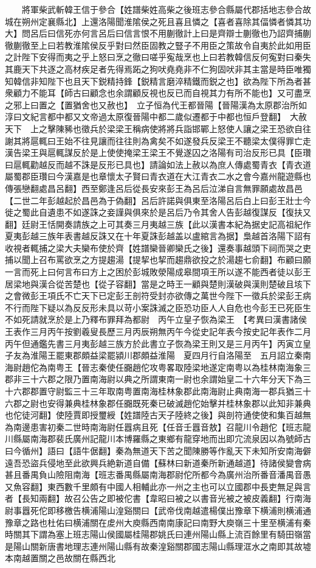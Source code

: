 　　將軍柴武斬韓王信于參合【姓譜柴姓高柴之後班志參合縣屬代郡括地志參合故城在朔州定襄縣北】上還洛陽聞淮隂侯之死且喜且憐之【喜者喜除其偪憐者憐其功大】問呂后曰信死亦何言呂后曰信言恨不用蒯徹計上曰是齊辯士蒯徹也乃詔齊捕蒯徹蒯徹至上曰若教淮隂侯反乎對曰然臣固教之豎子不用臣之策故令自夷於此如用臣之計陛下安得而夷之乎上怒曰烹之徹曰嗟乎寃哉烹也上曰若教韓信反何寃對曰秦失其鹿天下共逐之高材疾足者先得焉跖之狗吠堯堯非不仁狗固吠非其主當是時臣唯獨知韓信非知陛下也且天下鋭精持鋒【鋭精言磨淬精鐵而鋭之也】欲為陛下所為者甚衆顧力不能耳【師古曰顧念也余謂顧反視也反已而自視其力有所不能也】又可盡烹之邪上曰置之【置猶舍也又赦也】　立子恒為代王都晉陽【晉陽漢為太原郡治所如淳曰文紀言都中都又文帝過太原復晉陽中都二歲似遷都于中都也恒戶登翻】　大赦天下　上之擊陳豨也徵兵於梁梁王稱病使將將兵詣邯鄲上怒使人讓之梁王恐欲自往謝其將扈輒曰王始不往見讓而往往則為禽矣不如遂發兵反梁王不聽梁太僕得罪亡走漢告梁王與扈輒謀反於是上使使掩梁王梁王不覺遂囚之洛陽有司治反形已具【臣瓚曰扈輒勸越反而越不誅是反形已具也】請論如法上赦以為庶人傳處蜀青衣【青衣道屬蜀郡臣瓚曰今漢嘉是也章懷太子賢曰青衣道在大江青衣二水之會今嘉州龍遊縣也傳張戀翻處昌呂翻】西至鄭逢呂后從長安來彭王為呂后泣涕自言無罪願處故昌邑【二世二年彭越起於昌邑為于偽翻】呂后許諾與俱東至洛陽呂后白上曰彭王壯士今徙之蜀此自遺患不如遂誅之妾謹與俱來於是呂后乃令其舍人告彭越復謀反【復扶又翻】廷尉王恬開奏請族之上可其奏三月夷越三族【此以漢書本紀為据史記高祖紀作夏夷彭越三族年表書越反誅又在十年夏誅彭越盖以盧綰言為据】梟越首洛陽下詔有收視者輒捕之梁大夫欒布使於齊【姓譜欒晉卿欒氏之後】還奏事越頭下祠而哭之吏捕以聞上召布罵欲烹之方提趨湯【提挈也挈而趨鼎欲投之於湯趨七俞翻】布顧曰願一言而死上曰何言布曰方上之困於彭城敗滎陽成皋間項王所以遂不能西者徒以彭王居梁地與漢合從苦楚也【從子容翻】當是之時王一顧與楚則漢破與漢則楚破且垓下之會微彭王項氏不亡天下已定彭王剖符受封亦欲傳之萬世今陛下一徵兵於梁彭王病不行而陛下疑以為反反形未具以苛小案誅滅之臣恐功臣人人自危也今彭王已死臣生不如死請就烹於是上乃釋布罪拜為都尉　丙午立皇子恢為梁王　【考異曰漢書諸侯王表作三月丙午按劉羲叟長歷三月丙辰朔無丙午今從史記年表今按史記年表作二月丙午但通鑑先書三月夷彭越三族方於此書立子恢為梁王則又是三月丙午】丙寅立皇子友為淮陽王罷東郡頗益梁罷潁川郡頗益淮陽　夏四月行自洛陽至　五月詔立秦南海尉趙佗為南粤王【晉志秦使任嚻趙佗攻粤畧取陸梁地遂定南粤以為桂林南海象三郡非三十六郡之限乃置南海尉以典之所謂東南一尉也余謂始皇二十六年分天下為三十六郡郡置守尉監三十三年取南粤置南海桂林象郡此南海尉止典南海一郡兵猶三十六郡之尉也安得兼典桂林象郡任嚻既死秦已破滅趙佗始擊并桂林象郡以此知非兼典也佗徒河翻】使陸賈即授璽綬【姓譜陸古天子陸終之後】與剖符通使使和集百越無為南邊患害初秦二世時南海尉任囂病且死【任音壬囂音敖】召龍川令趙佗【班志龍川縣屬南海郡裴氏廣州記龍川本博羅縣之東鄉有龍穿地而出即宂流泉因以為號師古曰今循州】語曰【語牛倨翻】秦為無道天下苦之聞陳勝等作亂天下未知所安南海僻遠吾恐盜兵侵地至此欲興兵絶新道自備【蘇林曰新道秦所新通越道】待諸侯變會病甚且番禺負山險阻南海【班志番禺縣屬南海郡尉佗所都今為廣州治所番音潘禺音愚又魚容翻】東西數千里頗有中國人相輔此亦一州之主也可以立國郡中長吏無足與言者【長知兩翻】故召公告之即被佗書【韋昭曰被之以書音光被之被皮義翻】行南海尉事囂死佗即移檄告横浦陽山湟谿關曰【武帝伐南越遣楊僕出豫章下横浦則横浦通豫章之路也杜佑曰横浦關在䖍州大庾縣西南南康記曰南野大庾嶺三十里至横浦有秦時關其下謂為塞上班志陽山侯國屬桂陽郡姚氏曰連州陽山縣上流百餘里有騎田嶺當是陽山關新唐書地理志連州陽山縣有故秦湟谿關郡國志陽山縣理洭水之南即其故墟本南越置關之邑故關在縣西北